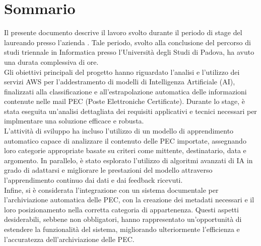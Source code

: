 \cleardoublepage
{}
{}
\begingroup
\let\clearpage\relax
\let\cleardoublepage\relax

\chapter*{Sommario}

Il presente documento descrive il lavoro svolto durante il periodo di stage del laureando \myName presso l'azienda \myCompany. Tale periodo, svolto alla conclusione del percorso di studi triennale in Informatica presso l'Università degli Studi di Padova, ha avuto una durata complessiva di \myHours ore. \\
Gli obiettivi principali del progetto hanno riguardato l'analisi e l'utilizzo dei servizi AWS per l'addestramento di modelli di Intelligenza Artificiale (AI), finalizzati alla classificazione e all'estrapolazione automatica delle informazioni contenute nelle mail PEC (Poste Elettroniche Certificate). Durante lo stage, è stata eseguita un'analisi dettagliata dei requisiti applicativi e tecnici necessari per implmentare una soluzione efficace e robusta. \\
L'attività di sviluppo ha incluso l'utilizzo di un modello di apprendimento automatico capace di analizzare il contenuto delle PEC importate, assegnando loro categorie appropriate basate su criteri come mittente, destinatario, data e argomento. In parallelo, è stato esplorato l'utilizzo di algoritmi avanzati di IA in grado di adattarsi e migliorare le prestazioni del modello attraverso l'apprendimento continuo dai dati e dai feedback ricevuti. \\
Infine, si è considerata l'integrazione con un sistema documentale per l'archiviazione automatica delle PEC, con la creazione dei metadati necessari e il loro posizionamento nella corretta categoria di appartenenza. Questi aspetti desiderabili, sebbene non obbligatori, hanno rappresentato un'opportunità di estendere la funzionalità del sistema, migliorando ulteriormente l'efficienza e l'accuratezza dell'archiviazione delle PEC. \\

\endgroup
\vfill
